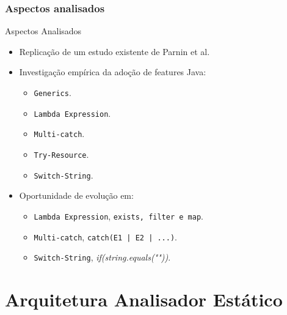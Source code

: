 \documentclass[]{beamer}
\begin{document}
		
	\begin{frame}[label=AspectosAnalisados]
		\frametitle{Aspectos analisados}
		\begin{block}{Aspectos Analisados}
			\begin{itemize}				
				\item Replicação de um estudo existente de Parnin et al.
				
				\item Investigação empírica da adoção de features Java:
					\begin{itemize}
						\item \texttt{Generics}.
						\item \texttt{Lambda Expression}.
						\item \texttt{Multi-catch}.
						\item \texttt{Try-Resource}.
						\item \texttt{Switch-String}.
					\end{itemize}

				\item Oportunidade de evolução em:
					\begin{itemize}
						\item \texttt{Lambda Expression}, \texttt{exists, filter e map}.
						\item \texttt{Multi-catch}, \texttt{catch(E1 | E2 | ...)}.
						\item \texttt{Switch-String}, \textit{if(string.equals(""))}.
					\end{itemize}

			\end{itemize}
		\end{block}
	\end{frame}	
		
		
		
	

\section{Arquitetura Analisador Estático}
\end{document}
